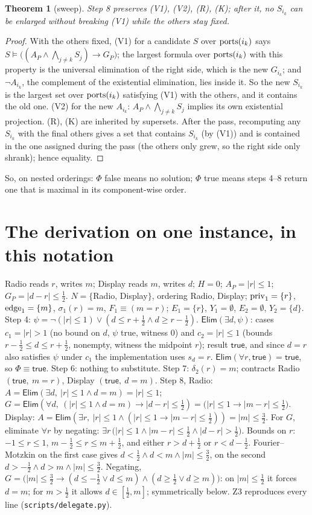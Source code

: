 \documentclass[10pt]{article}
\theoremstyle{plain}\newtheorem{theorem}{Theorem}\newtheorem{lemma}{Lemma}
\theoremstyle{definition}\newtheorem{definition}{Definition}
\newcommand{\ELIM}{\mathsf{Elim}}\newcommand{\TRUE}{\mathsf{true}}
\begin{document}
\begin{theorem}[sweep]\label{thm:sweep}
Step 8 preserves (V1), (V2), (R), (K); after it, no $S_{i_k}$ can be enlarged without breaking (V1) while the others stay fixed.
\end{theorem}
\begin{proof}
With the others fixed, (V1) for a candidate $S$ over $\mathrm{ports}(i_k)$ says $S\models\big((A_P\wedge\bigwedge_{j\ne k}S_j)\to G_P\big)$; the largest formula over $\mathrm{ports}(i_k)$ with this property is the universal elimination of the right side, which is the new $G_{i_k}$; and $\neg A_{i_k}$, the complement of the existential elimination, lies inside it. So the new $S_{i_k}$ is the largest set over $\mathrm{ports}(i_k)$ satisfying (V1) with the others, and it contains the old one. (V2) for the new $A_{i_k}$: $A_P\wedge\bigwedge_{j\ne k}S_j$ implies its own existential projection. (R), (K) are inherited by supersets. After the pass, recomputing any $S_{i_k}$ with the final others gives a set that contains $S_{i_k}$ (by (V1)) and is contained in the one assigned during the pass (the others only grew, so the right side only shrank); hence equality.
\end{proof}
So, on nested orderings: $\Phi$ false means no solution; $\Phi$ true means steps 4--8 return one that is maximal in its component-wise order.

\section{The derivation on one instance, in this notation}
Radio reads $r$, writes $m$; Display reads $m$, writes $d$; $H=0$; $A_P=|r|\le1$; $G_P=|d-r|\le\tfrac12$. $N=\{$Radio, Display$\}$, ordering Radio, Display; $\mathrm{priv}_1=\{r\}$, $\mathrm{edge}_1=\{m\}$, $\sigma_1(r)=m$, $F_1\equiv(m=r)$; $E_1=\{r\}$, $Y_1=\emptyset$, $E_2=\emptyset$, $Y_2=\{d\}$.
Step 4: $\psi=\neg(|r|\le1)\vee(d\le r+\tfrac12\wedge d\ge r-\tfrac12)$. $\ELIM(\exists d,\psi)$: cases $c_1=|r|>1$ (no bound on $d$, $\psi$ true, witness $0$) and $c_2=|r|\le1$ (bounds $r-\tfrac12\le d\le r+\tfrac12$, nonempty, witness the midpoint $r$); result $\TRUE$, and since $d=r$ also satisfies $\psi$ under $c_1$ the implementation uses $s_d=r$. $\ELIM(\forall r,\TRUE)=\TRUE$, so $\Phi\equiv\TRUE$.
Step 6: nothing to substitute. Step 7: $\delta_2(r)=m$; contracts Radio $(\TRUE,\ m=r)$, Display $(\TRUE,\ d=m)$.
Step 8, Radio: $A=\ELIM(\exists d,\ |r|\le1\wedge d=m)=|r|\le1$; $G=\ELIM(\forall d,\ (|r|\le1\wedge d=m)\to|d-r|\le\tfrac12)=\big(|r|\le1\to|m-r|\le\tfrac12\big)$.
Display: $A=\ELIM(\exists r,\ |r|\le1\wedge(|r|\le1\to|m-r|\le\tfrac12))=|m|\le\tfrac32$. For $G$, eliminate $\forall r$ by negating: $\exists r\,\big(|r|\le1\wedge|m-r|\le\tfrac12\wedge|d-r|>\tfrac12\big)$. Bounds on $r$: $-1\le r\le1$, $m-\tfrac12\le r\le m+\tfrac12$, and either $r>d+\tfrac12$ or $r<d-\tfrac12$. Fourier--Motzkin on the first case gives $d<\tfrac12\wedge d<m\wedge|m|\le\tfrac32$, on the second $d>-\tfrac12\wedge d>m\wedge|m|\le\tfrac32$. Negating, $G=\big(|m|\le\tfrac32\to(d\le-\tfrac12\vee d\le m)\wedge(d\ge\tfrac12\vee d\ge m)\big)$: on $|m|\le\tfrac12$ it forces $d=m$; for $m>\tfrac12$ it allows $d\in[\tfrac12,m]$; symmetrically below. Z3 reproduces every line (\texttt{scripts/delegate.py}).
\end{document}
